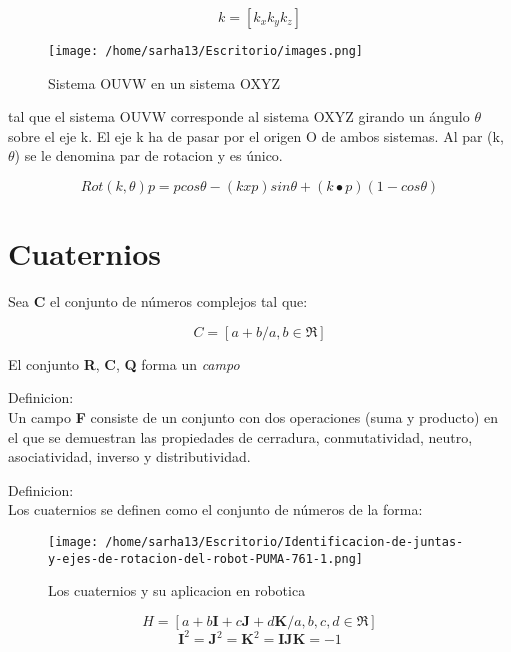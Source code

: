 \documentclass[letterpaper, openright, 12pt, spanish]{report}
\begin{document}
\begin{displaymath}
k=[k_{x} k_{y}	k_{z}]
\end{displaymath}

\begin{figure}[htp]
\centering
\texttt{[image: /home/sarha13/Escritorio/images.png]}
\caption{Sistema OUVW en un sistema OXYZ}
\label{Figura 1}
\end{figure}

tal que el sistema OUVW corresponde al sistema OXYZ girando un \'angulo $\theta$ sobre el eje k. El eje k ha de pasar por el origen O de ambos sistemas.
Al par (k, $\theta$) se le denomina par de rotacion y es \'unico.

\begin{displaymath}
Rot{(k,\theta)p}=pcos\theta-{(kxp)}sin\theta+{(k\bullet p)(1-cos\theta)}
\end{displaymath}

\section{Cuaternios}
Sea \textbf{C} el conjunto de n\'umeros complejos tal que:

\begin{displaymath}
C={[a+b/a,b\in\Re]}
\end{displaymath}

El conjunto \textbf{R}, \textbf{C}, \textbf{Q} forma un \textit{campo}

Definicion:\\
Un campo \textbf{F} consiste de un conjunto con dos operaciones (suma y producto) en el que se demuestran las propiedades de cerradura, conmutatividad, neutro, asociatividad, inverso y distributividad.

Definicion:\\
Los cuaternios se definen como el conjunto de n\'umeros de la forma:

\begin{figure}[htp]
\centering
\texttt{[image: /home/sarha13/Escritorio/Identificacion-de-juntas-y-ejes-de-rotacion-del-robot-PUMA-761-1.png]}
\caption{Los cuaternios y su aplicacion en robotica}
\label{Figura 2.}
\end{figure}

\begin{displaymath}
H={[a+b\textbf{I}+c\textbf{J}+d\textbf{K}/a,b,c,d\in\Re]}
\end{displaymath}
\begin{displaymath}
\textbf{I}^2=\textbf{J}^2=\textbf{K}^2=\textbf{IJK}=-1
\end{displaymath}
\end{document}

